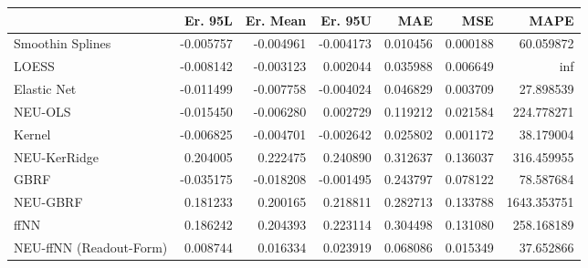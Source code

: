 \begin{tabular}{lrrrrrr}
\toprule
{} &   Er. 95L &  Er. Mean &   Er. 95U &       MAE &       MSE &         MAPE \\
\midrule
Smoothin Splines        & -0.005757 & -0.004961 & -0.004173 &  0.010456 &  0.000188 &    60.059872 \\
LOESS                   & -0.008142 & -0.003123 &  0.002044 &  0.035988 &  0.006649 &          inf \\
Elastic Net             & -0.011499 & -0.007758 & -0.004024 &  0.046829 &  0.003709 &    27.898539 \\
NEU-OLS                 & -0.015450 & -0.006280 &  0.002729 &  0.119212 &  0.021584 &   224.778271 \\
Kernel                  & -0.006825 & -0.004701 & -0.002642 &  0.025802 &  0.001172 &    38.179004 \\
NEU-KerRidge            &  0.204005 &  0.222475 &  0.240890 &  0.312637 &  0.136037 &   316.459955 \\
GBRF                    & -0.035175 & -0.018208 & -0.001495 &  0.243797 &  0.078122 &    78.587684 \\
NEU-GBRF                &  0.181233 &  0.200165 &  0.218811 &  0.282713 &  0.133788 &  1643.353751 \\
ffNN                    &  0.186242 &  0.204393 &  0.223114 &  0.304498 &  0.131080 &   258.168189 \\
NEU-ffNN (Readout-Form) &  0.008744 &  0.016334 &  0.023919 &  0.068086 &  0.015349 &    37.652866 \\
\bottomrule
\end{tabular}
